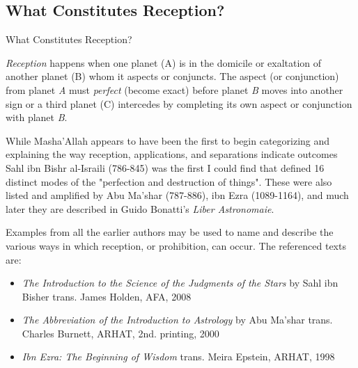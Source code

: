 \subsection{What Constitutes Reception?}
\begin{frame}[t]{What Constitutes Reception?}
\small
\begin{block}{}
\textsl{Reception} happens when one planet (A) is in the domicile or exaltation of another planet (B) whom it aspects or conjuncts. The aspect (or conjunction) from planet \textsl{A} must \textsl{perfect} (become exact)  before planet \textsl{B} moves into another sign or a third planet (C) intercedes by completing its own aspect or conjunction with planet \textsl{B}.
\end{block}

While Masha'Allah appears to have been the first to begin categorizing and explaining the way reception, applications, and separations indicate outcomes Sahl ibn Bishr al-Israili (786-845) was the first I could find that defined 16 distinct modes of the "perfection and destruction of things". These were also listed and amplified by  Abu Ma'shar (787-886),  ibn Ezra (1089-1164), and much later they are described in Guido Bonatti's \textsl{Liber Astronomaie}.

Examples from all the earlier authors may be used to name and describe the various ways in which reception, or prohibition, can occur. The referenced texts are:
\begin{itemize}
\small
\item \textsl{The Introduction to the Science of the Judgments of the Stars} by Sahl ibn Bisher trans. James Holden, AFA, 2008

\item \textsl{The Abbreviation of the Introduction to Astrology} by Abu Ma'shar trans. Charles Burnett, ARHAT, 2nd. printing, 2000

\item \textsl{Ibn Ezra: The Beginning of Wisdom} trans. Meira Epstein, ARHAT, 1998
\end{itemize}

\end{frame}
